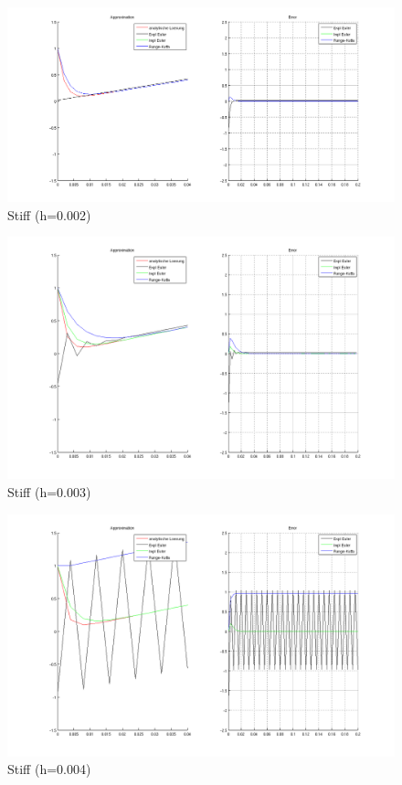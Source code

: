 \documentclass[10pt]{scrartcl}
\begin{document}
	
	\begin{figure}[H]
			\centering	
			\includegraphics[width=\textwidth]{stiff0002.png}
            \caption{Stiff (h=0.002)}
            \label{pic:stuff002}
		\end{figure} 
	
	
	\begin{figure}[H]
			\centering	
			\includegraphics[width=\textwidth]{stiff0003.png}
            \caption{Stiff (h=0.003)}
            \label{pic:stuff003}
		\end{figure} 
	
	
	\begin{figure}[H]
			\centering	
			\includegraphics[width=\textwidth]{stiff0004.png}
            \caption{Stiff (h=0.004)}
            \label{pic:stuff004}
		\end{figure} 
	
\end{document}
